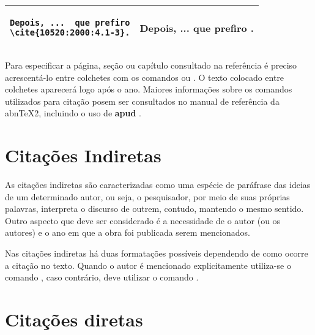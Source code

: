 \begin{quadro}[htb]
\begin{tabular}{|c|c|}
\begin{minipage}[t]{\VerbL}
\vspace{5pt}
\begin{verbatim}
Depois, ...  que prefiro
\cite{10520:2000:4.1-3}.
\end{verbatim}
\vspace{5pt}
\end{minipage}
&
\begin{minipage}[t]{\LatL}
\vspace{5pt}
Depois, {...} que prefiro \cite{10520:2000:4.1-3}.
\vspace{5pt}
\end{minipage}\\ \hline

\end{tabular}
\end{quadro}


Para especificar a página, seção ou capítulo consultado na referência é preciso acrescentá-lo entre colchetes com os comandos  ou . O texto colocado entre colchetes aparecerá logo após o ano. Maiores informações sobre os comandos utilizados para citação posem ser consultados no manual de referência da abnTeX2, incluindo o uso de \textbf{apud} \cite{abntex2cite-alf}.


\section{Citações Indiretas}

As citações indiretas são caracterizadas como uma espécie de paráfrase das ideias de um determinado autor, ou seja, o pesquisador, por meio de suas próprias palavras, interpreta o discurso de outrem, contudo, mantendo o mesmo sentido. Outro aspecto que deve ser considerado é a necessidade de o autor (ou os autores) e o ano em que a obra foi publicada serem mencionados. 

Nas citações indiretas há duas formatações possíveis dependendo de como ocorre a citação no texto. Quando o autor é mencionado explicitamente utiliza-se o comando , caso contrário, deve utilizar o comando . 



\section{Citações diretas}
\label{sec-citacao}


